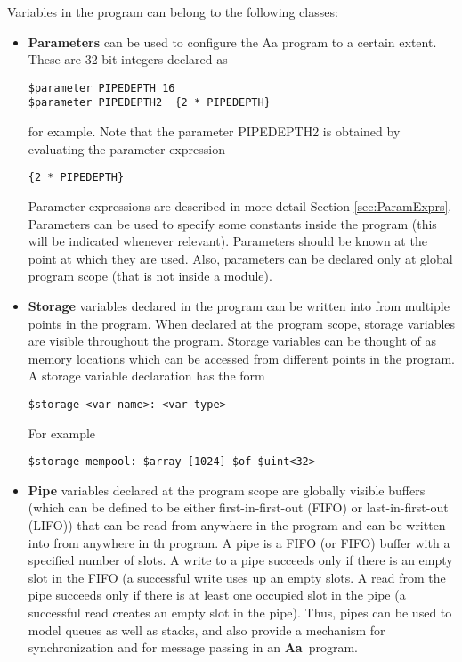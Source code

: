 \documentclass{article}
\newcommand{\Aa}{{\bf Aa}~}
\begin{document}
Variables in  the program can belong to the following classes:
\begin{itemize}
\item {\bf Parameters} can be used to configure the Aa program to
a certain extent.  These are 32-bit integers declared as
\begin{verbatim}
$parameter PIPEDEPTH 16
$parameter PIPEDEPTH2  {2 * PIPEDEPTH} 
\end{verbatim}
for example.    Note that the parameter
PIPEDEPTH2 is obtained by evaluating the
parameter expression 
\begin{verbatim}
{2 * PIPEDEPTH} 
\end{verbatim}
Parameter expressions  are described in more detail Section \ref{sec:ParamExprs}.
Parameters can be used to specify some 
constants inside
the program (this will be indicated whenever relevant).
Parameters
should be known at the point at which they are used.  Also,
parameters can be declared only at global program scope (that is
not inside a module).
\item {\bf Storage} variables declared in the program
can be written into from multiple
points in the program.  When declared at the program
scope, storage variables are visible throughout
the program.  Storage variables can be thought of 
as memory locations which can be accessed from different
points in the program.
A storage variable declaration has the form
\begin{verbatim}
$storage <var-name>: <var-type> 
\end{verbatim}
For example
\begin{verbatim}
$storage mempool: $array [1024] $of $uint<32>
\end{verbatim}
\item {\bf Pipe} variables declared at the program scope
are globally visible buffers (which
can be defined to be either first-in-first-out (FIFO) or
last-in-first-out (LIFO)) that can 
be read from anywhere in the program and can be
written into from anywhere in th program.  A pipe
is a FIFO (or FIFO) buffer with a specified number of
slots.  A write to a pipe succeeds
only if there is an empty slot in the FIFO (a successful
write uses up an empty slots.  A read
from the pipe succeeds only if there is at
least one occupied slot in the pipe (a successful read
creates an empty slot in the pipe). 
Thus, pipes can be used to model queues as
well as stacks, and also provide a mechanism for synchronization and
for message passing in an \Aa program.
\begin{itemize}

\end{itemize}
\end{itemize}
\end{document}
